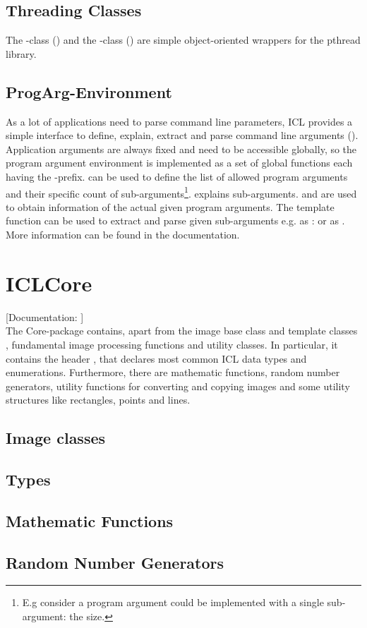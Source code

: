 \subsection{Threading Classes}
The -class () and the -class () are simple object-oriented wrappers for the pthread library.

\subsection{ProgArg-Environment} 
As a lot of applications need to parse command line parameters, ICL provides a simple interface to define, explain, extract and parse command line arguments (). Application arguments are always fixed and need to be accessible globally, so the program argument environment is  implemented as a set of global functions each having the -prefix.  can be used to define the list of allowed program arguments and their specific count of sub-arguments\footnote{E.g consider a program argument  could be implemented with a single sub-argument: the size.}.  explains sub-arguments.  and  are used to obtain information of the actual given program arguments.  The  template function can be used to extract and parse given sub-arguments e.g. as :
or as 
. More information can be found in the documentation.



\section{ICLCore}

[Documentation: ]\\
The Core-package contains, apart from the image base class  and template classes , fundamental image processing functions and utility classes. In particular, it contains the header , that declares most common ICL data types and enumerations. Furthermore, there are mathematic functions, random number generators, utility functions for converting and copying images and some utility structures like rectangles, points and lines.

\subsection{Image classes}

\subsection{Types}

\subsection{Mathematic Functions}

\subsection{Random Number Generators}


